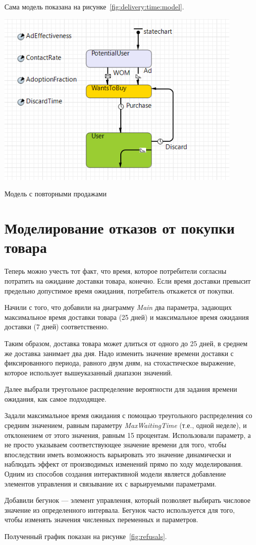 Сама модель показана на рисунке~\ref{fig:delivery:time:model}.

\begin{image}
	\includegraphics[width=0.9\textwidth]{2023-03-28_17-31-28}
	\caption{Модель с повторными продажами}
	\label{fig:delivery:time:model}
\end{image}

\section{Моделирование отказов от покупки товара}
Теперь можно учесть тот факт, что время, которое потребители согласны
потратить на ожидание доставки товара, конечно. Если время доставки превысит
предельно допустимое время ожидания, потребитель откажется от покупки.\par
Начили с того, что добавили на диаграмму \textit{Main} два параметра,
задающих максимальное время доставки товара (25 дней) и максимальное
время ожидания доставки (7 дней) соответственно.\par
Таким образом, доставка товара может длиться от одного до 25 дней, в среднем
же доставка занимает два дня. Надо изменить значение времени доставки с
фиксированного периода, равного двум дням, на стохастическое выражение,
которое использует вышеуказанный диапазон значений.\par
Далее выбрали треугольное распределение вероятности для задания времени
ожидания, как самое подходящее.\par
Задали максимальное время ожидания с помощью треугольного
распределения со средним значением, равным параметру \textit{MaxWaitingTime}
(т.е., одной неделе), и отклонением от этого значения, равным 15 процентам.
Использовали параметр, а не просто указываем соответствующее значение
времени для того, чтобы впоследствии иметь возможность варьировать это
значение динамически и наблюдать эффект от производимых изменений прямо
по ходу моделирования. Одним из способов создания интерактивной модели
является добавление элементов управления и связывание их с варьируемыми
параметрами.\par
Добавили бегунок --- элемент управления, который позволяет выбирать
числовое значение из определенного интервала. Бегунок часто используется для
того, чтобы изменять значения численных переменных и параметров.\par
Полученный график показан на рисунке~\ref{fig:refusals}.

